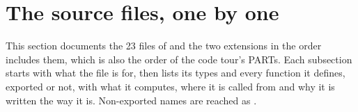 \section{The source files, one by one}\label{sec:reference}
This section documents the 23 files of  and the two extensions in the order 
includes them, which is also the order of the code tour's PARTs. Each subsection starts with what the file is for,
then lists its types and every function it defines, exported or not, with what it computes, where it is called from
and why it is written the way it is. Non-exported names are reached as .





